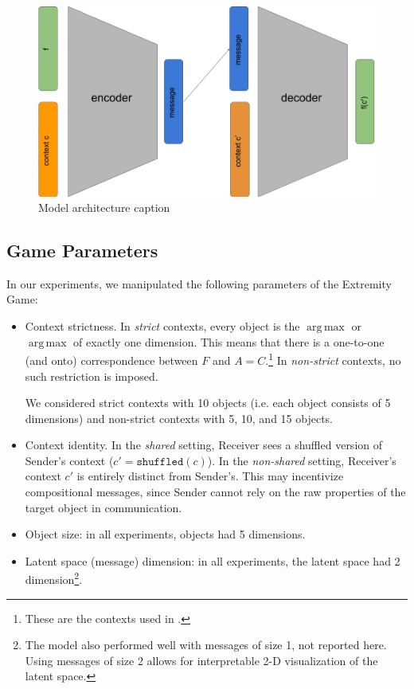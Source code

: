 \documentclass[11pt,a4paper]{article}
\DeclareMathOperator*{\argmax}{arg\,max}
\newcommand{\nbSST}[1]{{\leavevmode\color{violet}{\scriptsize#1}}}
\begin{document}
\begin{figure}[ht]
	\centering
	\includegraphics[width=\columnwidth]{./figures/model_figure.png}
	\caption{Model architecture caption \nbSST{Do we really need this? It isn't super informative and might use too much space. I can also do something in TikZ if we think it's important and that this one is ugly.}}
	\label{fig:model}
\end{figure}

\subsection{Game Parameters}

In our experiments, we manipulated the following parameters of the Extremity Game:
\begin{itemize}
	\item Context strictness. 
		In \emph{strict} contexts, every object is the $\argmax$ or $\argmax$ of exactly one dimension.  This means that there is a one-to-one (and onto) correspondence between $F$ and $A = C$.\footnote{These are the contexts used in \cite{Steinert-Threlkeld2019a}.}  In \emph{non-strict} contexts, no such restriction is imposed.

		We considered strict contexts with 10 objects (i.e. each object consists of 5 dimensions) and non-strict contexts with 5, 10, and 15 objects.
	\item Context identity. In the \emph{shared} setting, Receiver sees a shuffled version of Sender's context ($c' = \texttt{shuffled}(c)$). In the \emph{non-shared} setting, Receiver's context $c'$ is entirely distinct from Sender's.  This may incentivize compositional messages, since Sender cannot rely on the raw properties of the target object in communication.
	\item Object size: in all experiments, objects had 5 dimensions.
	\item Latent space (message) dimension: in all experiments, the latent space had 2 dimension\footnote{The model also performed well with messages of size 1, not reported here. Using messages of size 2 allows for interpretable 2-D visualization of the latent space.}.
\end{itemize}
\end{document}
